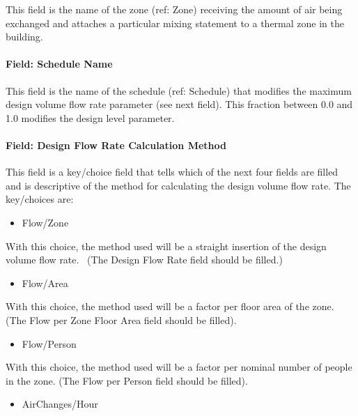 This field is the name of the zone (ref: Zone) receiving the amount of air being exchanged and attaches a particular mixing statement to a thermal zone in the building.

\paragraph{Field: Schedule Name}\label{field-schedule-name-3}

This field is the name of the schedule (ref: Schedule) that modifies the maximum design volume flow rate parameter (see next field). This fraction between 0.0 and 1.0 modifies the design level parameter.

\paragraph{Field: Design Flow Rate Calculation Method}\label{field-design-flow-rate-calculation-method-2}

This field is a key/choice field that tells which of the next four fields are filled and is descriptive of the method for calculating the design volume flow rate. The key/choices are:

\begin{itemize}
\tightlist
\item
  Flow/Zone
\end{itemize}

With this choice, the method used will be a straight insertion of the design volume flow rate.~ (The Design Flow Rate field should be filled.)

\begin{itemize}
\tightlist
\item
  Flow/Area
\end{itemize}

With this choice, the method used will be a factor per floor area of the zone. (The Flow per Zone Floor Area field should be filled).

\begin{itemize}
\tightlist
\item
  Flow/Person
\end{itemize}

With this choice, the method used will be a factor per nominal number of people in the zone. (The Flow per Person field should be filled).

\begin{itemize}
\tightlist
\item
  AirChanges/Hour
\end{itemize}


